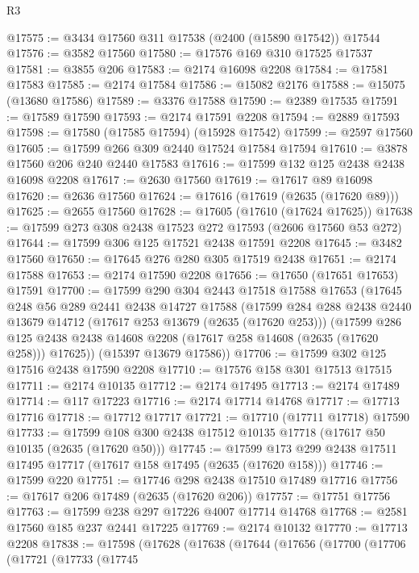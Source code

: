 \begin{lexlean}{R3}
\begin{coremodule}
@17575 := @3434 @17560 @311 @17538 (@2400 (@15890 @17542)) @17544
@17576 := @3582 @17560
@17580 := @17576 @169 @310 @17525 @17537
@17581 := @3855 @206
@17583 := @2174 @16098 @2208
@17584 := @17581 @17583
@17585 := @2174 @17584
@17586 := @15082 @2176
@17588 := @15075 (@13680 @17586)
@17589 := @3376 @17588
@17590 := @2389 @17535
@17591 := @17589 @17590
@17593 := @2174 @17591 @2208
@17594 := @2889 @17593
@17598 := @17580 (@17585 @17594) (@15928 @17542)
@17599 := @2597 @17560
@17605 := @17599 @266 @309 @2440 @17524 @17584 @17594
@17610 := @3878 @17560 @206 @240 @2440 @17583
@17616 := @17599 @132 @125 @2438 @2438 @16098 @2208
@17617 := @2630 @17560
@17619 := @17617 @89 @16098
@17620 := @2636 @17560
@17624 := @17616 (@17619 (@2635 (@17620 @89)))
@17625 := @2655 @17560
@17628 := @17605 (@17610 (@17624 @17625))
@17638 := @17599 @273 @308 @2438 @17523 @272 @17593 (@2606 @17560 @53 @272)
@17644 := @17599 @306 @125 @17521 @2438 @17591 @2208
@17645 := @3482 @17560
@17650 := @17645 @276 @280 @305 @17519 @2438
@17651 := @2174 @17588
@17653 := @2174 @17590 @2208
@17656 := @17650 (@17651 @17653) @17591
@17700 := @17599
    @290
    @304
    @2443
    @17518
    @17588
    @17653
    (@17645
      @248
      @56
      @289
      @2441
      @2438
      @14727
      @17588
      (@17599
        @284
        @288
        @2438
        @2440
        @13679
        @14712
        (@17617 @253 @13679 (@2635 (@17620 @253)))
        (@17599
          @286
          @125
          @2438
          @2438
          @14608
          @2208
          (@17617 @258 @14608 (@2635 (@17620 @258)))
          @17625))
      (@15397 @13679 @17586))
@17706 := @17599 @302 @125 @17516 @2438 @17590 @2208
@17710 := @17576 @158 @301 @17513 @17515
@17711 := @2174 @10135
@17712 := @2174 @17495
@17713 := @2174 @17489
@17714 := @117 @17223
@17716 := @2174 @17714 @14768
@17717 := @17713 @17716
@17718 := @17712 @17717
@17721 := @17710 (@17711 @17718) @17590
@17733 := @17599 @108 @300 @2438 @17512 @10135 @17718 (@17617 @50 @10135 (@2635 (@17620 @50)))
@17745 := @17599 @173 @299 @2438 @17511 @17495 @17717 (@17617 @158 @17495 (@2635 (@17620 @158)))
@17746 := @17599 @220
@17751 := @17746 @298 @2438 @17510 @17489 @17716
@17756 := @17617 @206 @17489 (@2635 (@17620 @206))
@17757 := @17751 @17756
@17763 := @17599 @238 @297 @17226 @4007 @17714 @14768
@17768 := @2581 @17560 @185 @237 @2441 @17225
@17769 := @2174 @10132
@17770 := @17713 @2208
@17838 := @17598
    (@17628
      (@17638
        (@17644
          (@17656
            (@17700
              (@17706
                (@17721
                  (@17733
                    (@17745

\end{coremodule}
\end{lexlean}
